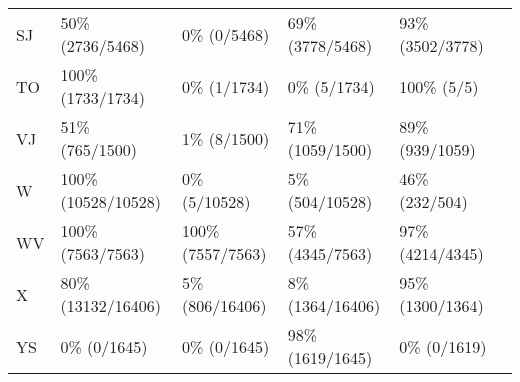 \begin{tiny}
\begin{tabular}{|l|l|l|l|l|l|}
SJ & 50\% (2736/5468) & 0\% (0/5468) & 69\% (3778/5468) & 93\% (3502/3778)  \\
TO & 100\% (1733/1734) & 0\% (1/1734) & 0\% (5/1734) & 100\% (5/5)  \\
VJ & 51\% (765/1500) & 1\% (8/1500) & 71\% (1059/1500) & 89\% (939/1059)  \\
W & 100\% (10528/10528) & 0\% (5/10528) & 5\% (504/10528) & 46\% (232/504)  \\
WV & 100\% (7563/7563) & 100\% (7557/7563) & 57\% (4345/7563) & 97\% (4214/4345)  \\
X & 80\% (13132/16406) & 5\% (806/16406) & 8\% (1364/16406) & 95\% (1300/1364)  \\
YS & 0\% (0/1645) & 0\% (0/1645) & 98\% (1619/1645) & 0\% (0/1619)  \\
\hline
\end{tabular}
\end{tiny}
